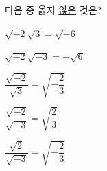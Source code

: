 다음 중 옳지 \underline{않은} 것은?
\begin{choicesii}{\rule[-3ex]{0pt}{8ex}$\sqrt{-2}\sqrt{3}=\sqrt{-6}$}{\rule[-3ex]{0pt}{8ex}$\sqrt{-2}\sqrt{-3}=-\sqrt{6}$}{\rule[-3ex]{0pt}{8ex}$\dfrac{\sqrt{-2}}{\sqrt{3}}=\sqrt{-\dfrac{2}{3}}$}{\rule[-3ex]{0pt}{8ex}$\dfrac{\sqrt{-2}}{\sqrt{-3}}=\sqrt{\dfrac{2}{3}}$}{\rule[-3ex]{0pt}{8ex}$\dfrac{\sqrt{2}}{\sqrt{-3}}=\sqrt{-\dfrac{2}{3}}$}\end{choicesii}
